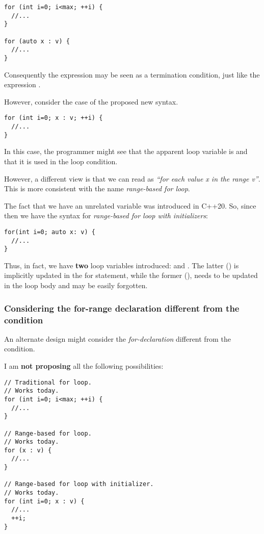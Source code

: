 \begin{lstlisting}
for (int i=0; i<max; ++i) {
  //...
}

for (auto x : v) {
  //...
}
\end{lstlisting}

Consequently the expression  may be seen as a termination
condition, just like the expression .

However, consider the case of the proposed new syntax.
\begin{lstlisting}
for (int i=0; x : v; ++i) {
  //...
}
\end{lstlisting} 

In this case, the programmer might see that the apparent loop variable is
 and that it is used in the loop condition.

However, a different view is that we can read  as
\emph{``for each value x in the range v''}. This is more consistent with the
name \emph{range-based for loop}.

The fact that we have an unrelated variable  was introduced in C++20. So,
since then we have the syntax for \emph{range-based for loop with initializers}:

\begin{lstlisting}
for(int i=0; auto x: v) {
  //...
}
\end{lstlisting}

Thus, in fact, we have \textbf{two} loop variables introduced:  and
. The latter () is implicitly updated in the for statement,
while the former (), needs to be updated in the loop body and may be
easily forgotten.
 
\subsubsection{Considering the for-range declaration different from the
condition}

An alternate design might consider the \emph{for-declaration} different from the
condition.

I am \textbf{not proposing} all 
the following possibilities:

\begin{lstlisting}
// Traditional for loop. 
// Works today.
for (int i=0; i<max; ++i) {
  //...
}

// Range-based for loop. 
// Works today.
for (x : v) {
  //...
}

// Range-based for loop with initializer. 
// Works today.
for (int i=0; x : v) {
  //...
  ++i;
}
\end{lstlisting}

